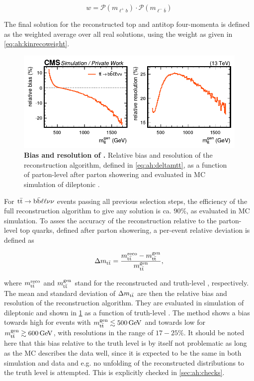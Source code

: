 \begin{equation}
\label{eq:ah:kinrecoweight}
    w = \mathcal{P} (m_{\ell^+ b}) \cdot \mathcal{P} (m_{\ell^- \bar{b}})
\end{equation}

The final solution for the reconstructed top and antitop four-momenta is defined as the weighted average over all real solutions, using the weight as given in \cref{eq:ah:kinrecoweight}.

\begin{figure}[t]
    \centering
    \includegraphics[width=0.99\linewidth]{figures/ah/mtt_resolution.pdf}
    \caption{\textbf{Bias and resolution of \mtt.} Relative bias and resolution of the \ttbar reconstruction algorithm, defined in \cref{eq:ah:deltamtt}, as a function of parton-level \mtt after parton showering and evaluated in MC simulation of dileptonic \ttbar.}
    \label{fig:ah:resolution}
\end{figure}

For $\mathrm{t \bar{t}} \rightarrow \mathrm{b \bar{b}} \ell \ell \nu \nu$ events passing all previous selection steps, the efficiency of the full reconstruction algorithm to give any solution is ca. $90\%$, as evaluated in MC simulation. To asses the accuracy of the reconstruction relative to the parton-level top quarks, defined after parton showering, a per-event relative deviation is defined as 

\begin{equation}
\label{eq:ah:deltamtt}
    \Delta m_{\mathrm{t \bar{t}}} = \frac{m_{\mathrm{t \bar{t}}}^{\mathrm{reco}} - m_{\mathrm{t \bar{t}}}^{\mathrm{gen}}} {m_{\mathrm{t \bar{t}}}^{\mathrm{gen}}},
\end{equation}

\noindent where $m_{\mathrm{t \bar{t}}}^{\mathrm{reco}}$ and $m_{\mathrm{t \bar{t}}}^{\mathrm{gen}}$ stand for the reconstructed and truth-level \mtt, respectively. The mean and standard deviation of $\Delta m_{\mathrm{t \bar{t}}}$ are then the relative bias and resolution of the reconstruction algorithm. They are evaluated in simulation of dileptonic \ttbar and shown in \cref{fig:ah:resolution} as a function of truth-level \mtt. The method shows a bias towards high \mtt for events with $\mtt^{\mathrm{gen}} \lesssim \SI{500}{\GeV}$ and towards low \mtt for $\mtt^{\mathrm{gen}} \gtrsim \SI{600}{\GeV}$, with resolutions in the range of $17-25\%$. It should be noted here that this bias relative to the truth level is by itself not problematic as long as the MC describes the data well, since it is expected to be the same in both simulation and data and e.g. no unfolding of the reconstructed distributions to the truth level is attempted. This is explicitly checked in \cref{sec:ah:checks}.

